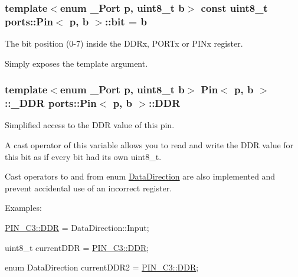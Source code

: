 \subsubsection[{\texorpdfstring{bit}{bit}}]{\setlength{\rightskip}{0pt plus 5cm}template$<$enum \+\_\+\+Port p, uint8\+\_\+t b$>$ const uint8\+\_\+t {\bf ports\+::\+Pin}$<$ p, b $>$\+::bit = b\hspace{0.3cm}{\ttfamily [static]}}\hypertarget{structports_1_1Pin_aea726b85cfe5e49822dd2517da5c860f}{}\label{structports_1_1Pin_aea726b85cfe5e49822dd2517da5c860f}


The bit position (0-\/7) inside the D\+D\+Rx, P\+O\+R\+Tx or P\+I\+Nx register. 

Simply exposes the template argument. 
\subsubsection[{\texorpdfstring{D\+DR}{DDR}}]{\setlength{\rightskip}{0pt plus 5cm}template$<$enum \+\_\+\+Port p, uint8\+\_\+t b$>$ {\bf Pin}$<$ p, b $>$\+::{\bf \+\_\+\+D\+DR} {\bf ports\+::\+Pin}$<$ p, b $>$\+::D\+DR\hspace{0.3cm}{\ttfamily [static]}}\hypertarget{structports_1_1Pin_aaebb4d6cb5db0635fe8e7d6e7d315c7f}{}\label{structports_1_1Pin_aaebb4d6cb5db0635fe8e7d6e7d315c7f}


Simplified access to the D\+DR value of this pin. 

A cast operator of this variable allows you to read and write the D\+DR value for this bit as if every bit had its own {\ttfamily uint8\+\_\+t}.

Cast operators to and from enum \hyperlink{namespaceports_a46987e78fa447129742fadda5eccafb4}{Data\+Direction} are also implemented and prevent accidental use of an incorrect register.

Examples\+:


\begin{DoxyItemize}
\item {\ttfamily \hyperlink{structports_1_1Pin_aaebb4d6cb5db0635fe8e7d6e7d315c7f}{P\+I\+N\+\_\+\+C3\+::\+D\+DR} = Data\+Direction\+::\+Input;}
\item {\ttfamily uint8\+\_\+t current\+D\+DR = \hyperlink{structports_1_1Pin_aaebb4d6cb5db0635fe8e7d6e7d315c7f}{P\+I\+N\+\_\+\+C3\+::\+D\+DR};}
\item {\ttfamily enum Data\+Direction current\+D\+D\+R2 = \hyperlink{structports_1_1Pin_aaebb4d6cb5db0635fe8e7d6e7d315c7f}{P\+I\+N\+\_\+\+C3\+::\+D\+DR};} 
\end{DoxyItemize}
